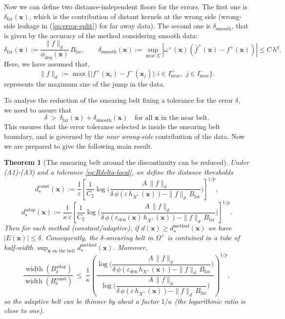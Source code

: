 \documentclass[preprint]{elsarticle}       %
\newtheorem{theorem}{Theorem}[section]
\begin{document}
Now we can define two distance-independent floors for the errors. The first one is $\delta_{\mathrm{far}}(\mathbf{x})$, which is the contribution of distant kernels at the wrong side (wrong-side leakage in (\ref{eq:error-split}) for far away data). The second one is $\delta_{\mathrm{smooth}}$, that is given by the accuracy of the method considering smooth data:
\[
\delta_{\mathrm{far}}(\mathbf{x}):=\frac{\|f\|_{d}}{\phi_{\mathrm{den}}(\mathbf{x})}\,B_{\mathrm{far}},
\qquad
\delta_{\mathrm{smooth}}(\mathbf{x}):=\sup_{\text{near }\Sigma}|\omega^{+}(\mathbf{x})(\bar f^{+}(\mathbf{x})-f^{+}(\mathbf{x}))|\le C\,h^{q}.
\]
Here, we have assumed that,
\begin{equation}\label{salto}
\|f\|_{d}
:= \max\{\bigl| f^+(\mathbf{x}_i) - f^-(\mathbf{x}_j) \bigr|: i\in I^+_{\mathrm{near}},\,\,j \in I^-_{\mathrm{near}}\}.
\end{equation}
represents the maximum size of the jump in the data.

To analyse the reduction of the smearing belt fixing a tolerance for the error $\delta$, we need to assure that
\begin{equation}\label{eq:Rdelta-local}
\delta\ >\ \delta_{\mathrm{far}}(\mathbf{x})+\delta_{\mathrm{smooth}}(\mathbf{x})
\quad\text{for all $\mathbf{x}$ in the near belt}.
\end{equation}
This ensures that the error tolerance selected is inside the smearing belt boundary, and is governed by the \emph{near wrong-side} contribution of the data. Now we are prepared to give the following main result.

\begin{theorem}[The smearing belt around the discontinuity can be reduced]
\label{thm:thinning-local}
Under \textnormal{(A1)}-\textnormal{(A3)} and a tolerance \eqref{eq:Rdelta-local}, we define the
distance thresholds
\[
d_{\star}^{\mathrm{const}}(\mathbf{x})
:=\frac{1}{\varepsilon}\left[
\frac{1}{C_2}\log\!\Big(
\frac{A\,\|f\|_{d}}{
\delta\,\phi(\varepsilon\,h_{X^{+}}(\mathbf{x}))-\|f\|_{d}\,B_{\mathrm{far}}}
\Big)\right]^{\!1/p},
\]
\[
d_{\star}^{\mathrm{adap}}(\mathbf{x})
:=\frac{1}{\kappa\,\varepsilon}\left[
\frac{1}{C_2}\log\!\Big(
\frac{A\,\|f\|_{d}}{
\delta\,\phi(\varepsilon_{\mathrm{den}}(\mathbf{x})\,h_{X^{+}}(\mathbf{x}))
-\|f\|_{d}\,B_{\mathrm{far}}}
\Big)\right]^{\!1/p}.
\]
Then for each method (constant/adaptive), \emph{if} $d(\mathbf{x})\ge d_{\star}^{\mathrm{method}}(\mathbf{x})$
we have $|E(\mathbf{x})|\le \delta$. Consequently, the $\delta$-smearing belt in $\Omega^{+}$ is contained in
a tube of half-width $\sup_{\mathbf{x}\text{ on the belt}} d_{\star}^{\mathrm{method}}(\mathbf{x})$.
Moreover,
\[
\frac{\operatorname{width}(B_{\delta}^{\mathrm{adap}})}
     {\operatorname{width}(B_{\delta}^{\mathrm{const}})}
\ \le\
\frac{1}{\kappa}\left(
\frac{
\log\Big(\!\dfrac{A\,\|f\|_{d}}{\delta\,\phi(\varepsilon_{\mathrm{den}}\,h_{X^{+}}(\mathbf{x}))-\|f\|_{d}\,B_{\mathrm{far}}}\Big)
}{
\log\Big(\!\dfrac{A\,\|f\|_{d}}{\delta\,\phi(\varepsilon\,h_{X^{+}}(\mathbf{x}))-\|f\|_{d}\,B_{\mathrm{far}}}\Big)
}
\right)^{\!1/p},
\]
so the adaptive belt can be thinner by about a factor $1/\kappa$ (the logarithmic ratio is close to one).
\end{theorem}
\end{document}
